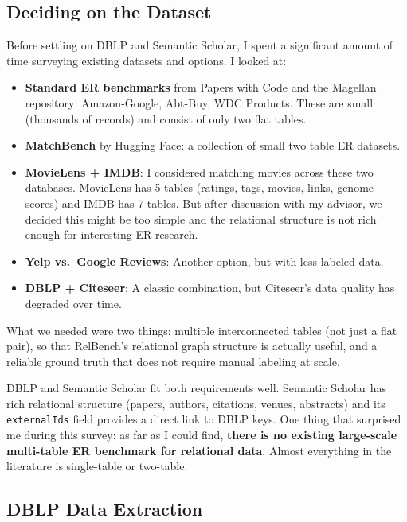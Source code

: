 \documentclass{article}
\begin{document}
\subsection{Deciding on the Dataset}
\label{sec:deciding}

Before settling on DBLP and Semantic Scholar, I spent a significant amount of time surveying existing datasets and options.
I looked at:

\begin{itemize}
    \item \textbf{Standard ER benchmarks} from Papers with Code and the Magellan repository: Amazon-Google, Abt-Buy, WDC Products. These are small (thousands of records) and consist of only two flat tables.
    \item \textbf{MatchBench} by Hugging Face: a collection of small two table ER datasets.
    \item \textbf{MovieLens + IMDB}: I considered matching movies across these two databases. MovieLens has 5 tables (ratings, tags, movies, links, genome scores) and IMDB has 7 tables. But after discussion with my advisor, we decided this might be too simple and the relational structure is not rich enough for interesting ER research.
    \item \textbf{Yelp vs.\ Google Reviews}: Another option, but with less labeled data.
    \item \textbf{DBLP + Citeseer}: A classic combination, but Citeseer's data quality has degraded over time.
\end{itemize}

What we needed were two things: multiple interconnected tables (not just a flat pair), so that RelBench's relational graph structure is actually useful, and a reliable ground truth that does not require manual labeling at scale.

DBLP and Semantic Scholar fit both requirements well.
Semantic Scholar has rich relational structure (papers, authors, citations, venues, abstracts) and its \texttt{externalIds} field provides a direct link to DBLP keys.
One thing that surprised me during this survey: as far as I could find, \textbf{there is no existing large-scale multi-table ER benchmark for relational data}. Almost everything in the literature is single-table or two-table.


\subsection{DBLP Data Extraction}
\end{document}
